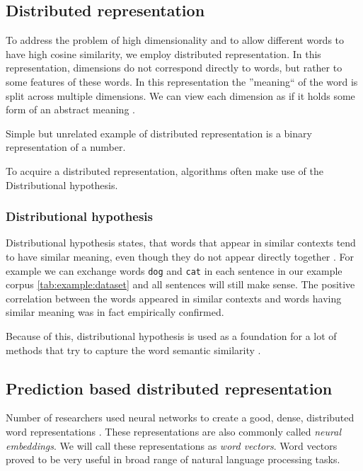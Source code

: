         \subsection{Distributed representation}
        To address the problem of high dimensionality and to allow different words to have high cosine similarity, we employ distributed representation.
        In this representation, dimensions do not correspond directly to words, but rather to some features of these words.
        In this representation the ''meaning`` of the word is split across multiple dimensions.
        We can view each dimension as if it holds some form of an abstract meaning \cite{le2014distributed}. 
        
        Simple but unrelated example of distributed representation is a binary representation of a number.
        
        To acquire a distributed representation, algorithms often make use of the Distributional hypothesis.
        \* %

        \subsubsection{Distributional hypothesis}
        Distributional hypothesis states, that words that appear in similar contexts tend to have similar meaning,
        even though they do not appear directly together \cite{harris1954distributional} \cite{Rubenstein:1965:CCS:365628.365657}. %
        For example we can exchange words \texttt{dog} and \texttt{cat} in each sentence in our example corpus \ref{tab:example:dataset}
        and all sentences will still make sense. 
        The positive correlation between the words appeared in similar contexts and words having similar meaning was in fact empirically confirmed.
        
        Because of this, distributional hypothesis is used as a foundation for a lot of methods that try to capture the word semantic similarity \cite{rubenstein1965contextual}. 

        \subsection{Prediction based distributed representation}
        Number of researchers used neural networks to create a good, dense, distributed word representations \cite{pennington2014glove} \cite{DBLP:conf/icml/LeM14} \cite{rong2014word2vec}. %
        These representations are also commonly called \emph{neural embeddings}.
        We will call these representations as \emph{word vectors}.
        Word vectors proved to be very useful in broad range of natural language processing tasks. 
        
